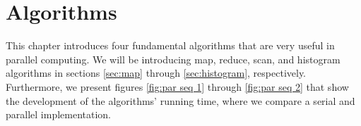 \chapter{Algorithms}
\label{chap:algorithms}

This chapter introduces four fundamental algorithms that are very useful in parallel computing.
We will be introducing map, reduce, scan, and histogram algorithms in sections \ref{sec:map} through \ref{sec:histogram}, respectively.
Furthermore, we present figures \ref{fig:par seq 1} through \ref{fig:par seq 2} that show the development of the algorithms' running time, where we compare a serial and parallel implementation.

%      
%      

%      
%      








